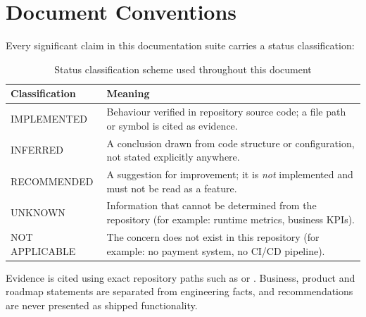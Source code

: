 \documentclass[11pt,a4paper]{article}
\begin{document}
\section*{Document Conventions}
\label{sec:conventions}

Every significant claim in this documentation suite carries a status classification:

\begin{table}[H]
\centering
\caption{Status classification scheme used throughout this document}
\label{tab:classification-scheme}
\begin{tabular}{@{}L{3.2cm}L{11.5cm}@{}}
\toprule
\textbf{Classification} & \textbf{Meaning} \\
\midrule
IMPLEMENTED & Behaviour verified in repository source code; a file path or symbol is cited as evidence. \\
INFERRED & A conclusion drawn from code structure or configuration, not stated explicitly anywhere. \\
RECOMMENDED & A suggestion for improvement; it is \emph{not} implemented and must not be read as a feature. \\
UNKNOWN & Information that cannot be determined from the repository (for example: runtime metrics, business KPIs). \\
NOT APPLICABLE & The concern does not exist in this repository (for example: no payment system, no CI/CD pipeline). \\
\bottomrule
\end{tabular}
\end{table}

\noindent Evidence is cited using exact repository paths such as  or . Business, product and roadmap statements are separated from engineering facts, and recommendations are never presented as shipped functionality.

\clearpage
{}
\end{document}
